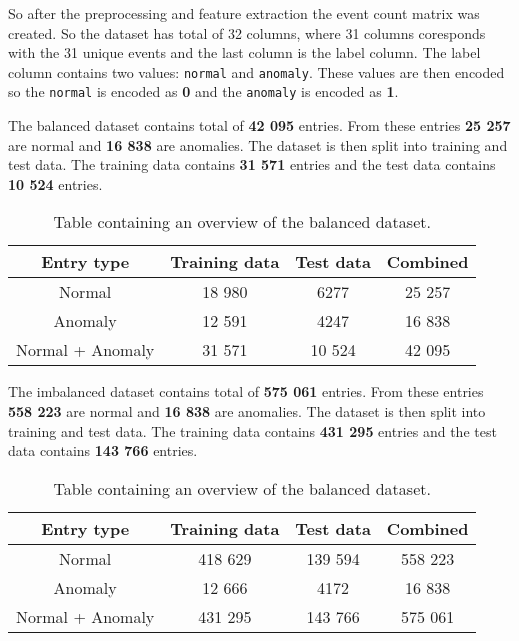 So after the preprocessing and feature extraction the event count matrix was created. So the dataset has total of 32 columns, where 31 columns coresponds with the 31 unique events and the last column is the label column.
The label column contains two values: \texttt{normal} and \texttt{anomaly}. These values are then encoded so the \texttt{normal} is encoded as \textbf{0} and the \texttt{anomaly} is encoded as \textbf{1}.

The balanced dataset contains total of \textbf{42 095} entries. From these entries \textbf{25 257} are normal and \textbf{16 838} are anomalies. 
The dataset is then split into training and test data. The training data contains \textbf{31 571} entries and the test data contains \textbf{10 524} entries. 

\begin{table}[hbt]
    \centering
    \begin{tabular}{|c|c|c|c|}
    \hline
    \textbf{Entry type} & \textbf{Training data} & \textbf{Test data} & \textbf{Combined} \\ \hline
    Normal             & 18 980                           & 6277                            & 25 257                          \\ \hline
    Anomaly              & 12 591                             & 4247                            & 16 838                          \\ \hline
    Normal + Anomaly    & 31 571                           & 10 524                            & 42 095                          \\ \hline
    \end{tabular}
    \caption{Table containing an overview of the balanced dataset.}    
\end{table}

The imbalanced dataset contains total of \textbf{575 061} entries. From these entries \textbf{558 223} are normal and \textbf{16 838} are anomalies.
The dataset is then split into training and test data. The training data contains \textbf{431 295} entries and the test data contains \textbf{143 766} entries.

\begin{table}[hbt]
    \centering
    \begin{tabular}{|c|c|c|c|}
    \hline
    \textbf{Entry type} & \textbf{Training data} & \textbf{Test data} & \textbf{Combined} \\ \hline
    Normal             & 418 629                           & 139 594                            & 558 223                          \\ \hline
    Anomaly              & 12 666                             & 4172                            & 16 838                          \\ \hline
    Normal + Anomaly    & 431 295                           & 143 766                            & 575 061                         \\ \hline
    \end{tabular}
    \caption{Table containing an overview of the balanced dataset.}    
\end{table}

